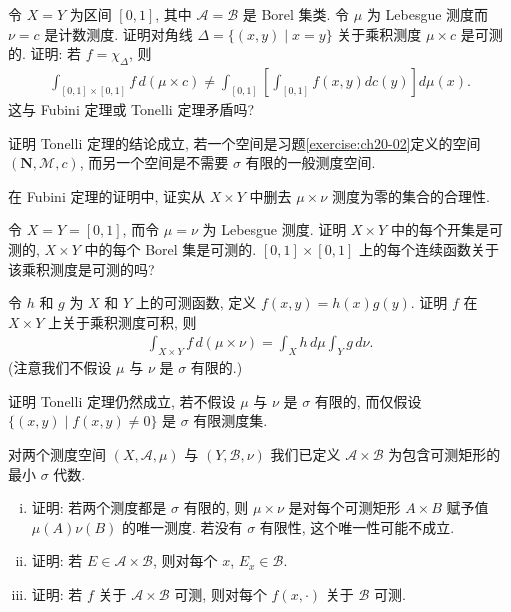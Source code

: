 \documentclass[../../main.tex]{subfiles}
\begin{document}
\begin{exercise}\label{exercise:ch20-06}
令 $X=Y$ 为区间 $[0,1]$, 其中 $\mathcal{A}=\mathcal{B}$ 是 Borel 集类. 令 $\mu$ 为 Lebesgue 测度而 $\nu=c$ 是计数测度. 证明对角线 $\Delta=\{(x,y)\mid x=y\}$ 关于乘积测度 $\mu\times c$ 是可测的. 证明: 若 $f=\chi_{\Delta}$, 则
\begin{align*}
\int_{[0,1]\times[0,1]}f\,d(\mu\times c)\neq\int_{[0,1]}\left[\int_{[0,1]}f(x,y)dc(y)\right]d\mu(x).
\end{align*}
这与 Fubini 定理或 Tonelli 定理矛盾吗?
\end{exercise}

\begin{exercise}\label{exercise:ch20-07}
证明 Tonelli 定理的结论成立, 若一个空间是习题\cref{exercise:ch20-02}定义的空间 $(\mathbf{N},\mathcal{M},c)$, 而另一个空间是不需要 $\sigma$ 有限的一般测度空间.
\end{exercise}

\begin{exercise}\label{exercise:ch20-08}
在 Fubini 定理的证明中, 证实从 $X\times Y$ 中删去 $\mu\times\nu$ 测度为零的集合的合理性.
\end{exercise}

\begin{exercise}\label{exercise:ch20-09}
令 $X=Y=[0,1]$, 而令 $\mu=\nu$ 为 Lebesgue 测度. 证明 $X\times Y$ 中的每个开集是可测的, $X\times Y$ 中的每个 Borel 集是可测的. $[0,1]\times[0,1]$ 上的每个连续函数关于该乘积测度是可测的吗?
\end{exercise}

\begin{exercise}\label{exercise:ch20-10}
令 $h$ 和 $g$ 为 $X$ 和 $Y$ 上的可测函数, 定义 $f(x,y)=h(x)g(y)$. 证明 $f$ 在 $X\times Y$ 上关于乘积测度可积, 则
\begin{align*}
\int_{X\times Y}f\,d(\mu\times\nu)=\int_{X}h\,d\mu\int_{Y}g\,d\nu.
\end{align*}
(注意我们不假设 $\mu$ 与 $\nu$ 是 $\sigma$ 有限的.)
\end{exercise}

\begin{exercise}\label{exercise:ch20-11}
证明 Tonelli 定理仍然成立, 若不假设 $\mu$ 与 $\nu$ 是 $\sigma$ 有限的, 而仅假设 $\{(x,y)\mid f(x,y)\neq 0\}$ 是 $\sigma$ 有限测度集.
\end{exercise}

\begin{exercise}\label{exercise:ch20-12}
对两个测度空间 $(X,\mathcal{A},\mu)$ 与 $(Y,\mathcal{B},\nu)$ 我们已定义 $\mathcal{A}\times\mathcal{B}$ 为包含可测矩形的最小 $\sigma$ 代数.
\begin{enumerate}[(i)]
\item 证明: 若两个测度都是 $\sigma$ 有限的, 则 $\mu\times\nu$ 是对每个可测矩形 $A\times B$ 赋予值 $\mu(A)\nu(B)$ 的唯一测度. 若没有 $\sigma$ 有限性, 这个唯一性可能不成立.
\item 证明: 若 $E\in\mathcal{A}\times\mathcal{B}$, 则对每个 $x$, $E_{x}\in\mathcal{B}$.
\item 证明: 若 $f$ 关于 $\mathcal{A}\times\mathcal{B}$ 可测, 则对每个 $f(x,\cdot)$ 关于 $\mathcal{B}$ 可测.
\end{enumerate}
\end{exercise}
\end{document}
